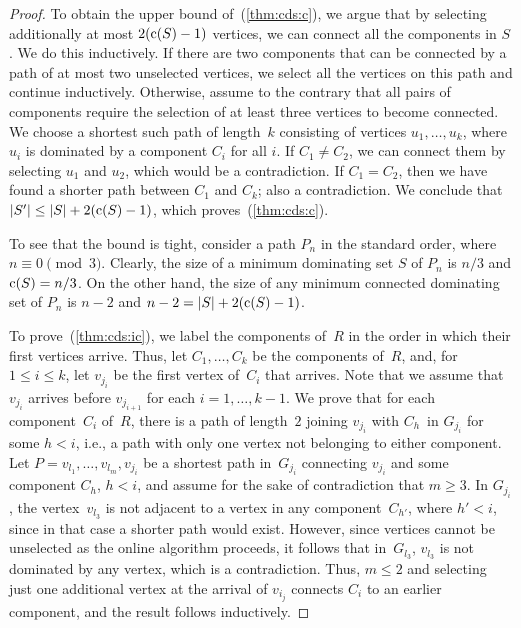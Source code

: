 \begin{proof}
To obtain the upper bound of~(\ref{thm:cds:c}), we argue that by selecting
additionally at most $2(\mathrm{c}(S)-1)$ vertices, we can connect all the
components in $S$. We do this inductively.  If there are two
components that can be connected by a path of at most two unselected vertices,
we select all the vertices on this path and continue
inductively. Otherwise, assume to the contrary that all pairs of
components require the selection of at least three vertices to become
connected.  We choose a shortest such path of length~$k$ consisting
of vertices $u_1,\ldots, u_k$, where $u_i$ is dominated by a
component $C_i$ for all $i$.  If $C_1 \not= C_2$, we can connect
them by selecting $u_1$ and $u_2$, which would be a contradiction.
If $C_1=C_2$, then we have found a shorter path between $C_1$ and
$C_k$; also a contradiction.  We conclude that $|S'| \le |S| + 2(\mathrm{c}(S) -1)$,
which proves~(\ref{thm:cds:c}).

To see that the bound is tight, consider a path $P_n$ in the standard order,
where $n\equiv 0 \pmod 3$. Clearly, the size of a minimum dominating
set $S$ of $P_n$ 
is $n/3$ and $\mathrm{c}(S) = n/3$. On the other hand,
the size of any minimum connected dominating set of $P_n$ is $n-2$
and $n-2 = |S| + 2(\mathrm{c}(S) - 1)$.

To prove~(\ref{thm:cds:ic}), we label the components of~$R$
in the order in which their first vertices
arrive. Thus, let $C_1, \ldots, C_k$ be the components of~$R$,
and, for $1 \leq i \leq k$, let
$v_{j_i}$ be the first vertex of~$C_i$ that arrives. Note that we assume that
$v_{j_i}$ arrives before $v_{j_{i+1}}$ for each $i = 1,\ldots, k-1$.
We prove that for each component~$C_i$ of~$R$,
there is a path of length~$2$
joining $v_{j_i}$ with $C_h$~in $G_{j_i}$ for some $h < i$,
i.e., a path with only one vertex not belonging to either component.
Let $P = v_{l_1}, \ldots, v_{l_m}, v_{j_i}$ be a
shortest path in~$G_{j_i}$ connecting $v_{j_i}$ and some component
$C_h$, $h < i$, and assume for the sake of contradiction that $m \geq 3$.
In $G_{j_i}$, the vertex~$v_{l_3}$ is not adjacent to a vertex in any
component~$C_{h'}$, 
where $h' < i$, since in that case a shorter path would exist.
However, since vertices cannot be unselected as the online algorithm proceeds,
it follows that in~$G_{l_3}$, $v_{l_3}$ is not dominated by any vertex,
which is a contradiction.
Thus, $m\le 2$ and selecting just one additional vertex at the arrival of $v_{i_j}$
connects $C_i$ to an earlier component,
and the result follows inductively.
 

\end{proof}
